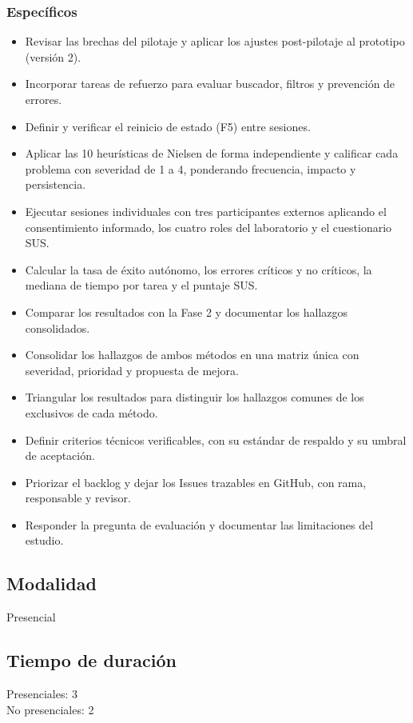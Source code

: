 \documentclass{article}
\begin{document}
\subsubsection{Específicos}
\begin{itemize}[leftmargin=1.5em, itemsep=2pt]
    \item Revisar las brechas del pilotaje y aplicar los ajustes post-pilotaje al prototipo (versión 2).
    \item Incorporar tareas de refuerzo para evaluar buscador, filtros y prevención de errores.
    \item Definir y verificar el reinicio de estado (F5) entre sesiones.
    \item Aplicar las 10 heurísticas de Nielsen de forma independiente y calificar cada problema con severidad de 1 a 4, ponderando frecuencia, impacto y persistencia.
    \item Ejecutar sesiones individuales con tres participantes externos aplicando el consentimiento informado, los cuatro roles del laboratorio y el cuestionario SUS.
    \item Calcular la tasa de éxito autónomo, los errores críticos y no críticos, la mediana de tiempo por tarea y el puntaje SUS.
    \item Comparar los resultados con la Fase 2 y documentar los hallazgos consolidados.
    \item Consolidar los hallazgos de ambos métodos en una matriz única con severidad, prioridad y propuesta de mejora.
    \item Triangular los resultados para distinguir los hallazgos comunes de los exclusivos de cada método.
    \item Definir criterios técnicos verificables, con su estándar de respaldo y su umbral de aceptación.
    \item Priorizar el backlog y dejar los Issues trazables en GitHub, con rama, responsable y revisor.
    \item Responder la pregunta de evaluación y documentar las limitaciones del estudio.
\end{itemize}

\subsection{Modalidad}
Presencial

\subsection{Tiempo de duración}
Presenciales: 3\\
No presenciales: 2
\end{document}
